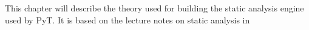 This chapter will describe the theory used for building the static analysis engine used by PyT.
It is based on the lecture notes on static analysis in \citet{schwartzbach}
